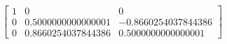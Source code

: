 \documentclass[preview]{standalone}
\begin{document}
\begin{align*}
\begin{bmatrix} 1 & 0 & 0 \\ 0 & 0.5000000000000001 & -0.8660254037844386 \\ 0 & 0.8660254037844386 & 0.5000000000000001\end{bmatrix}
\end{align*}
\end{document}
